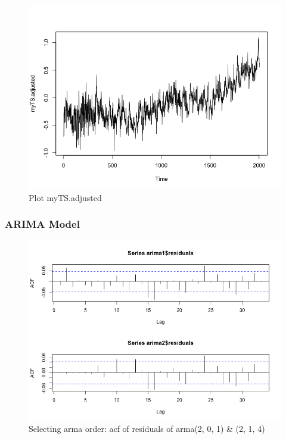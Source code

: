 \documentclass[a4paper,11pt]{article}
\begin{document}
\begin{figure}[H]
\centering
\caption{Plot myTS.adjusted}
\includegraphics[scale=.5]{myTSadjusted.png}
\end{figure}


\subsubsection{ARIMA Model}
\begin{figure}[H]
\centering
\caption{Selecting arma order: acf of residuals of arma(2, 0, 1) \& (2, 1, 4)}
\includegraphics[scale=.5]{armaacf.png}
\end{figure}
\end{document}
